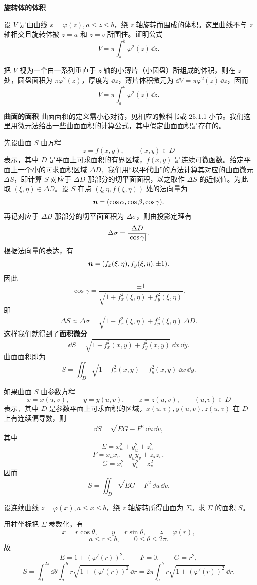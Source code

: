\textbf{旋转体的体积}

\begin{xexample}[22.5.1]
设 $V$ 是由曲线 $x=\varphi(z),a\le z\le b$，绕 $z$ 轴旋转而围成的体积。这里曲线不与 $z$ 轴相交且旋转体被 $z=a$ 和 $z=b$ 所围住。证明公式
\[
  V=\pi\int_a^b\varphi^2(z)\,\dd z.
\]
\end{xexample}
\begin{xproof}
把 $V$ 视为一个由一系列垂直于 $z$ 轴的小薄片（小圆盘）所组成的体积，则在 $z$ 处，圆盘面积为 $\pi\varphi^2(z)$，厚度为 $\dd z$，薄片体积微元为 $\dd V=\pi\varphi^2(z)\,\dd z$，因而
\[
  V=\pi\int_a^b\varphi^2(z)\,\dd z.
\]
\end{xproof}

\textbf{曲面的面积}
曲面面积的定义需小心对待，见相应的教科书或 25.1.1 小节。我们这里用微元法给出一些曲面面积的计算公式，其中假定曲面面积是存在的。

先设曲面 $S$ 由方程
\[
  z=f(x,y),\qquad(x,y)\in D
\]
表示，其中 $D$ 是平面上可求面积的有界区域，$f(x,y)$ 是连续可微函数。给定平面上一个小的可求面积区域 $\Delta D$，我们用“以平代曲”的方法计算其对应的曲面微元 $\Delta S$，即计算 $S$ 对应于 $\Delta D$ 那部分的切平面面积，以之取作 $\Delta S$ 的近似值。为此取 $(\xi,\eta)\in\Delta D$。设 $S$ 在点 $(\xi,\eta,f(\xi,\eta))$ 处的法向量为
\[
  \bm{n}=(\cos\alpha,\cos\beta,\cos\gamma).
\]
再记对应于 $\Delta D$ 那部分的切平面面积为 $\Delta\sigma$，则由投影定理有
\[
  \Delta\sigma=\frac{\Delta D}{\lvert\cos\gamma\rvert}.
\]
根据法向量的表达，有
\[
  \bm{n}=(f_x(\xi,\eta),f_y(\xi,\eta),\pm1).
\]
因此
\[
  \cos\gamma=\frac{\pm1}{\sqrt{1+f_x^2(\xi,\eta)+f_y^2(\xi,\eta)}}.
\]
即
\[
  \Delta S\approx\Delta\sigma
  =\sqrt{1+f_x^2(\xi,\eta)+f_y^2(\xi,\eta)}\,\Delta D.
\]
这样我们就得到了\textbf{面积微分}
\[
  \dd S=\sqrt{1+f_x^2(x,y)+f_y^2(x,y)}\,\dd x\,\dd y.
\]
曲面面积即为
\[
  S=\iint_D\sqrt{1+f_x^2(x,y)+f_y^2(x,y)}\,\dd x\,\dd y.
\]

如果曲面 $S$ 由参数方程
\[
  x=x(u,v),\qquad y=y(u,v),\qquad z=z(u,v),\qquad(u,v)\in D
\]
表示，其中 $D$ 是参数平面上可求面积的区域，$x(u,v),y(u,v),z(u,v)$ 在 $D$ 上有连续偏导数，则
\[
  \dd S=\sqrt{EG-F^2}\,\dd u\,\dd v,
\]
其中
\[
  E=x_u^2+y_u^2+z_u^2,
\]
\[
  F=x_ux_v+y_uy_v+z_uz_v,
\]
\[
  G=x_v^2+y_v^2+z_v^2.
\]
因而
\[
  S=\iint_D\sqrt{EG-F^2}\,\dd u\,\dd v.
\]

\begin{xexample}[22.5.2]
设连续曲线 $z=\varphi(x),a\le x\le b$，绕 $z$ 轴旋转所得曲面为 $\Sigma$。求 $\Sigma$ 的面积 $S$。
\end{xexample}
\begin{xsolution}
用柱坐标把 $\Sigma$ 参数化，有
\[
  x=r\cos\theta,\qquad y=r\sin\theta,\qquad z=\varphi(r),
\]
\[
  a\le r\le b,\qquad0\le\theta\le2\pi.
\]
故
\[
  E=1+(\varphi'(r))^2,\qquad F=0,\qquad G=r^2,
\]
\[
  S=\int_0^{2\pi}\dd\theta\int_a^b r\sqrt{1+(\varphi'(r))^2}\,\dd r
  =2\pi\int_a^b r\sqrt{1+(\varphi'(r))^2}\,\dd r.
\]
\end{xsolution}

